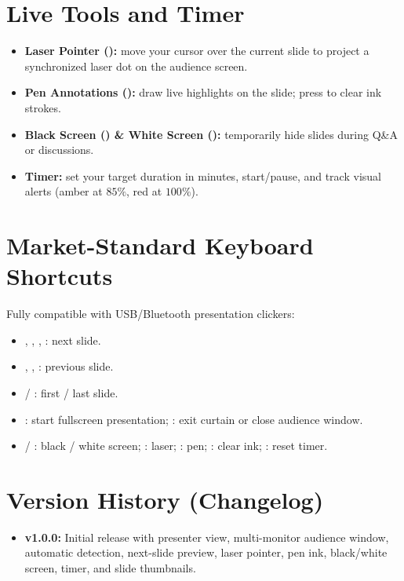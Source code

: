 \documentclass[11pt,a4paper]{article}
\begin{document}
\section{Live Tools and Timer}
\begin{itemize}
  \item \textbf{Laser Pointer ():} move your cursor over the current slide to project a synchronized laser dot on the audience screen.
  \item \textbf{Pen Annotations ():} draw live highlights on the slide; press  to clear ink strokes.
  \item \textbf{Black Screen () \& White Screen ():} temporarily hide slides during Q\&A or discussions.
  \item \textbf{Timer:} set your target duration in minutes, start/pause, and track visual alerts (amber at $85\%$, red at $100\%$).
\end{itemize}

\section{Market-Standard Keyboard Shortcuts}
Fully compatible with USB/Bluetooth presentation clickers:
\begin{itemize}
  \item \code{$\rightarrow$}, , , : next slide.
  \item \code{$\leftarrow$}, , : previous slide.
  \item {} / : first / last slide.
  \item {}: start fullscreen presentation; : exit curtain or close audience window.
  \item {} / : black / white screen; : laser; : pen; : clear ink; : reset timer.
\end{itemize}

\section{Version History (Changelog)}
\begin{itemize}
  \item \textbf{v1.0.0:} Initial release with presenter view, multi-monitor audience window, automatic  detection, next-slide preview, laser pointer, pen ink, black/white screen, timer, and slide thumbnails.
\end{itemize}
\end{document}
